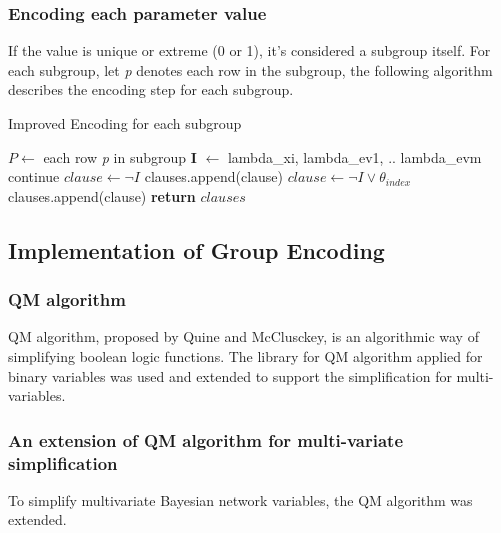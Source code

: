     \subsubsection{Encoding each parameter value}
    If the value is unique or extreme (0 or 1), it's considered a subgroup itself. For each subgroup, let \textit{p} denotes each row in the subgroup, the following algorithm describes the encoding step for each subgroup.
    \begin{algorithm}
    \caption{Improved Encoding for each subgroup}\label{algorithm:encode group}
    \begin{algorithmic}[1]
    \State $P \gets$ each row \textit{p} in subgroup 
        \State \textbf{I} $\gets$ lambda\_xi, lambda\_ev1, .. lambda\_evm
                \State continue
            \EndIf
                \State $clause \gets \neg I$
                \State clauses.append(clause)
            \Else
                \State $clause \gets \neg I \vee \theta_{index}$
                \State clauses.append(clause)
            \EndIf
        \EndFor
    \EndFor
    \State \textbf{return} $clauses$
    \EndProcedure
    \end{algorithmic}
    \end{algorithm}
    \subsection{Implementation of Group Encoding}
    \subsubsection{QM algorithm}
    QM algorithm, proposed by Quine and McClusckey, is an algorithmic way of simplifying boolean logic functions. The library for QM algorithm applied for binary variables was used and extended to support the simplification for multi-variables.
    
    \subsubsection{An extension of QM algorithm for multi-variate simplification}
    To simplify multi\-variate Bayesian network variables, the QM algorithm was extended.\\
    
